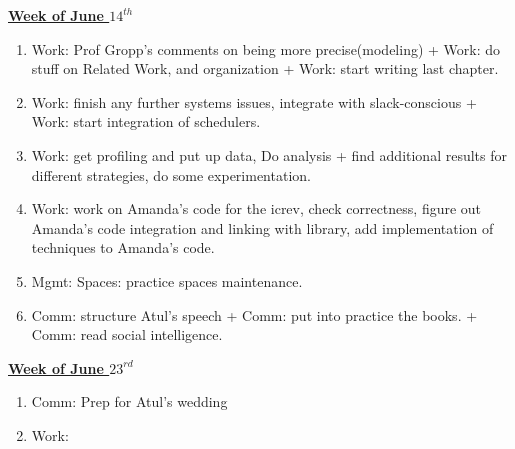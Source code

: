 \underline{\textbf{Week of June $14^{th}$}} \\
\begin{enumerate} 

\item Work: Prof Gropp's comments on being more precise(modeling) + Work: do stuff on Related Work, and organization + Work: start writing last chapter. 
\item Work: finish any further systems issues, integrate with slack-conscious +  Work: start integration of schedulers. 
\item Work: get profiling and put up data, Do analysis + find additional results for different strategies, do some
experimentation. 
\item Work: work on Amanda's code for the icrev, check correctness, figure out Amanda's code integration and linking with library, add implementation of techniques to Amanda's code. 

\item Mgmt: Spaces: practice spaces maintenance. 
\item Comm: structure Atul's speech + Comm: put into practice the books. + Comm: read social intelligence. 

\end{enumerate}

\underline{\textbf{Week of June $23^{rd}$}} \\
\begin{enumerate}

\item Comm: Prep for Atul's wedding 

\item Work: 

\end{enumerate}


